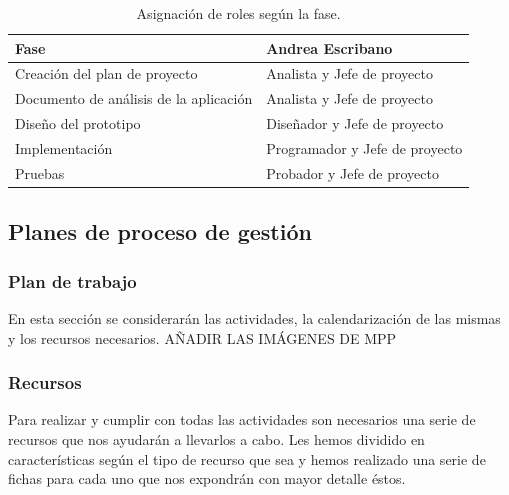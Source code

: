 \documentclass[a4paper,11pt, twoside]{article}
\begin{document}
\begin{table}[!h]
\hspace*{1cm}
\centering
\begin{tabular}{|M{7cm}|M{6.5cm}|}
 \hline
 Fase & Andrea Escribano \\
 \hline
 Creación del plan de proyecto & Analista y Jefe de proyecto  \\
 \hline
 Documento de análisis de la aplicación & Analista y Jefe de proyecto \\
 \hline
 Diseño del prototipo & Diseñador y Jefe de proyecto \\
 \hline
 Implementación & Programador y Jefe de proyecto \\
 \hline
 Pruebas &  Probador y Jefe de proyecto\\
 \hline
\end{tabular}
\caption{Asignación de roles según la fase.}
\label{ta:roles}
\end{table}
\subsection{Planes de proceso de gestión}
\subsubsection{Plan de trabajo}
En esta sección se considerarán las actividades, la calendarización de las mismas y los recursos necesarios.
{\color{red} AÑADIR LAS IMÁGENES DE MPP }
\subsubsection{Recursos}
Para realizar y cumplir con todas las actividades son necesarios una serie de recursos que nos ayudarán a llevarlos a cabo. Les hemos dividido en características según el tipo de recurso que sea y hemos realizado una serie de fichas para cada uno que nos expondrán con mayor detalle éstos.
\end{document}
